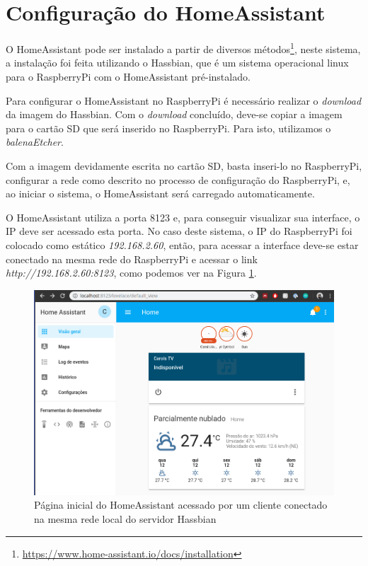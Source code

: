 \section{Configuração do HomeAssistant}

O HomeAssistant pode ser instalado a partir de diversos métodos\footnote{\url{https://www.home-assistant.io/docs/installation}}, neste sistema, a instalação foi feita utilizando o Hassbian, que é um sistema operacional linux para o RaspberryPi com o HomeAssistant pré-instalado.

Para configurar o HomeAssistant no RaspberryPi é necessário realizar o \textit{download} da imagem do Hassbian. Com o \textit{download} concluído, deve-se copiar a imagem para o cartão SD que será inserido no RaspberryPi. Para isto, utilizamos o \textit{balenaEtcher}.

Com a imagem devidamente escrita no cartão SD, basta inseri-lo no RaspberryPi, configurar a rede como descrito no processo de configuração do RaspberryPi, e, ao iniciar o sistema, o HomeAssistant será carregado automaticamente.

O HomeAssistant utiliza a porta 8123 e, para conseguir visualizar sua interface, o IP deve ser acessado esta porta. No caso deste sistema, o IP do RaspberryPi foi colocado como estático \textit{192.168.2.60}, então, para acessar a interface deve-se estar conectado na mesma rede do RaspberryPi e acessar o link \textit{http://192.168.2.60:8123}, como podemos ver na Figura \ref{fig:homeassistanthome}.

\begin{figure}[htbp]
	\centering
	\includegraphics[width=1\linewidth]{figuras/homeassistanthome.png}
	\caption{Página inicial do HomeAssistant acessado por um cliente conectado na mesma rede local do servidor Hassbian}
	\label{fig:homeassistanthome}
\end{figure}

